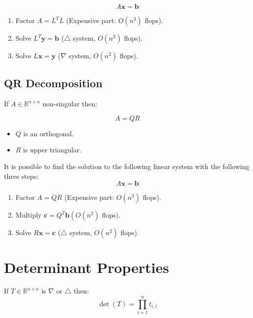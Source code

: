 \documentclass[11pt]{book}
\begin{document}
$$
A \mathbf{x}=\mathbf{b}
$$

\begin{enumerate}
  \item Factor $A=L^{T} L$ (Expensive part: $O\left(n^{3}\right)$ flops).

  \item Solve $L^{T} \mathbf{y}=\mathbf{b}$ ($\triangle$ system, $O\left(n^{2}\right)$ flops).

  \item Solve $L \mathbf{x}=\mathbf{y}$ ($\nabla$ system, $O\left(n^{2}\right)$ flops).

\end{enumerate}

\subsection*{QR Decomposition}
If $A \in \mathbb{R}^{n \times n}$ non-singular then:

$$
A=Q R
$$

\begin{itemize}
  \item $Q$ is an orthogonal.

  \item $R$ is upper triangular.

\end{itemize}
It is possible to find the solution to the following linear system  with the following three steps:
$$
A \mathbf{x}=\mathbf{b}
$$

\begin{enumerate}
  \item Factor $A=Q R$ (Expensive part: $O\left(n^{3}\right)$ flops).

  \item Multiply $\mathbf{c}=Q^{T} \mathbf{b}\left(O\left(n^{2}\right)\right.$ flops$).$

  \item Solve $R \mathbf{x}=\mathbf{c}$ ($\triangle$ system, $O\left(n^{2}\right)$ flops).

\end{enumerate}

\section*{Determinant Properties}
If $T \in \mathbb{R}^{n \times n}$ is $\nabla$ or $\triangle$ then:
$$
\operatorname{det}(T)=\prod_{i=1}^{n} t_{i, i}
$$
\end{document}
